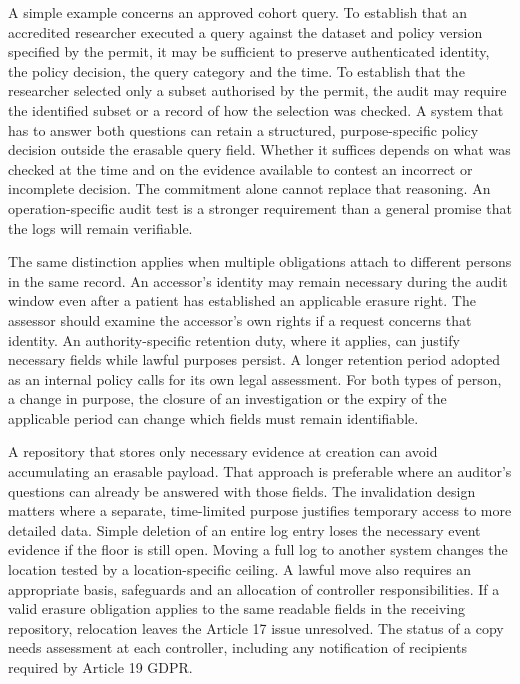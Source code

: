 \documentclass[preprint,review,12pt]{elsarticle}
\begin{document}
A simple example concerns an approved cohort query. To establish that an
accredited researcher executed a query against the dataset and policy
version specified by the permit, it may be sufficient to preserve
authenticated identity, the policy decision, the query category and the
time. To establish that the researcher selected only a subset authorised
by the permit, the audit may require the identified subset or a record
of how the selection was checked. A system that has to answer both
questions can retain a structured, purpose-specific policy decision
outside the erasable query field. Whether it suffices depends on what
was checked at the time and on the evidence available to contest an
incorrect or incomplete decision. The commitment alone cannot replace
that reasoning. An operation-specific audit test is a stronger
requirement than a general promise that the logs will remain verifiable.

The same distinction applies when multiple obligations attach to
different persons in the same record. An accessor's identity may remain
necessary during the audit window even after a patient has established
an applicable erasure right. The assessor should examine the accessor's
own rights if a request concerns that identity. An authority-specific
retention duty, where it applies, can justify necessary fields while
lawful purposes persist. A longer retention period adopted as an
internal policy calls for its own legal assessment. For both types of
person, a change in purpose, the closure of an investigation or the
expiry of the applicable period can change which fields must remain
identifiable.

A repository that stores only necessary evidence at creation can avoid
accumulating an erasable payload. That approach is preferable where an
auditor's questions can already be answered with those fields. The
invalidation design matters where a separate, time-limited purpose
justifies temporary access to more detailed data. Simple deletion of an
entire log entry loses the necessary event evidence if the floor is
still open. Moving a full log to another system changes the location
tested by a location-specific ceiling. A lawful move also requires an
appropriate basis, safeguards and an allocation of controller
responsibilities. If a valid erasure obligation applies to the same
readable fields in the receiving repository, relocation leaves the
Article 17 issue unresolved. The status of a copy needs assessment at
each controller, including any notification of recipients required by
Article 19 GDPR.
\end{document}
